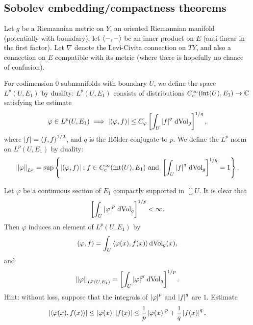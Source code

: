 \documentclass{amsart}
\begin{document}
\subsection*{Sobolev embedding/compactness theorems}
\begin{defn}
  Let $g$ be a Riemannian metric on $Y$, an oriented Riemannian manifold (potentially with boundary), let $\left\langle-,-\right\rangle$ be an inner product on $E$ (anti-linear in the first factor). Let $\nabla$ denote the Levi-Civita connection on $TY$, and also a connection on $E$ compatible with its metric (where there is hopefully no chance of confusion).

  For codimension $0$ submanifolds with boundary $U$, we define the space $L^{p}(U,E_{1})$ by duality: $L^{p}(U,E_{1})$ consists of distributions $C^{\infty}_{c}(\text{int}(U),E_{1})\to \mathbb{C}$ satisfying the estimate
  \begin{equation*}
    \varphi \in L^{p}(U,E_{1})\implies \left|(\varphi,f)\right|\le C_{\varphi}\left[\int_{U}\left|f\right|^{q}\,\mathrm{dVol}_{g}\right]^{1/q},
  \end{equation*}
  where $\left|f\right|=\left\langle f,f\right\rangle^{1/2}$, and $q$ is the H\"older conjugate to $p$. We define the $L^{p}$ norm on $L^{p}(U,E_{1})$ by duality:
  \begin{equation*}
    \left\lVert\varphi\right\rVert_{L^{p}}=\sup\left\{\left|(\varphi,f)\right|: f\in C^{\infty}_{c}(\text{int}(U),E_{1})\text{ and }\left[\int_{U}\left|f\right|^{q}\,\mathrm{dVol}_{g}\right]^{1/q}=1\right\}.
  \end{equation*}
  \begin{xca}
    Let $\varphi$ be a continuous section of $E_{1}$ compactly supported in $\closure{U}$. It is clear that
    \begin{equation*}
      \left[\int_{U}\left|\varphi\right|^{p}\,\mathrm{dVol}_{g}\right]^{1/p}<\infty.
    \end{equation*}
    Then $\varphi$ induces an element of $L^{p}(U,E_{1})$ by
    \begin{equation*}
      (\varphi,f)=\int_{U}\left\langle\varphi(x),f(x)\right\rangle\mathrm{dVol}_{g}(x),
    \end{equation*}
    and
    \begin{equation*}
      \left\lVert\varphi\right\rVert_{L^{p}(U,E_{1})}= \left[\int_{U}\left|\varphi\right|^{p}\,\mathrm{dVol}_{g}\right]^{1/p}.
    \end{equation*}
    Hint: without loss, suppose that the integrals of $\left|\varphi\right|^{p}$ and $\left|f\right|^{q}$ are $1$. Estimate
    \begin{equation*}
      \abs{\ip{\varphi(x),f(x)}}\le \abs{\varphi(x)}\abs{f(x)}\le \frac{1}{p}\abs{\varphi(x)}^{p}+\frac{1}{q}\abs{f(x)}^{q},

\end{equation*}
\end{xca}
\end{defn}
\end{document}

